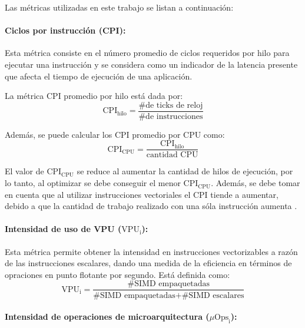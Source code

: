 Las métricas utilizadas en este trabajo se listan a continuación:

\paragraph*{Ciclos por instrucción (CPI):}

Esta métrica consiste en el número promedio de ciclos requeridos por hilo para ejecutar una instrucción y se considera como un indicador de la latencia presente que afecta el tiempo de ejecución de una aplicación.

La métrica CPI promedio por hilo está dada por:
\begin{equation}\label{eq:CPI_metric}
\text{CPI}_{\text{hilo}} = \frac{\text{\# de ticks de reloj}}{\# \text{de instrucciones}}
\end{equation}

Además, se puede calcular los CPI promedio por CPU como:
%
\begin{equation}\label{eq:CPIc_metric}
\text{CPI}_{\text{CPU}} = \frac{\text{CPI}_{\text{hilo}}}{\text{cantidad CPU}}
\end{equation}

El valor de $\text{CPI}_{\text{CPU}} $ se reduce al aumentar la cantidad de hilos de ejecución, por lo tanto, al optimizar se debe conseguir el menor $\text{CPI}_{\text{CPU}} $. Además, se debe tomar en cuenta que al utilizar instrucciones vectoriales el CPI tiende a aumentar, debido a que la cantidad de trabajo realizado con una sóla instrucción aumenta \cite{Jeffers2016315}.

\paragraph*{Intensidad de uso de VPU ($\text{VPU}_{\text{i}}$):}

Esta métrica permite obtener la intensidad en instrucciones vectorizables a razón de las instrucciones escalares, dando una medida de la eficiencia en términos de opraciones en punto flotante por segundo\cite{Jeffers2016315}. Está definida como:
%
\begin{equation}
\text{VPU}_{\text{i}}= \frac{\text{\# SIMD empaquetadas}}{\text{\# SIMD empaquetadas}+\text{\# SIMD escalares}}
\end{equation}

\paragraph*{Intensidad de operaciones de microarquitectura ($\mu\text{Ops}_{\text{i}}$):}

